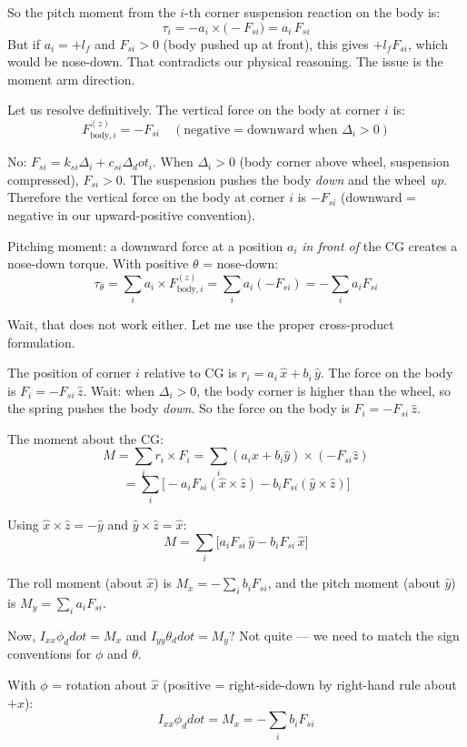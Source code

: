 \documentclass[11pt]{article}
\def\vect#1{#1}%
\def\ddot#1{#1_ddot}%
\def\dot#1{#1_dot}%
\newcommand{\vect}[1]{\bm{#1}}
\begin{document}
So the pitch moment from the $i$-th corner suspension reaction on the body is:
\[
\tau_i = -a_i \times \bigl(-F_{si}\bigr) = a_i\,F_{si}
\]
But if $a_i = +l_f$ and $F_{si}>0$ (body pushed up at front), this gives $+l_f F_{si}$, which would be nose-down. That contradicts our physical reasoning. The issue is the moment arm direction.

Let us resolve definitively. The vertical force on the body at corner $i$ is:
\[
F_{\text{body},i}^{(z)} = -F_{si} \quad (\text{negative} = \text{downward when } \Delta_i>0)
\]

No: $F_{si} = k_{si}\Delta_i + c_{si}\dot{\Delta}_i$. When $\Delta_i > 0$ (body corner above wheel, suspension compressed), $F_{si}>0$. The suspension pushes the body \emph{down} and the wheel \emph{up}. Therefore the vertical force on the body at corner $i$ is $-F_{si}$ (downward = negative in our upward-positive convention).

Pitching moment: a downward force at a position $a_i$ \emph{in front of} the CG creates a nose-down torque. With positive $\theta$ = nose-down:
\[
\tau_\theta = \sum_i a_i \times F_{\text{body},i}^{(z)} = \sum_i a_i(-F_{si}) = -\sum_i a_i F_{si}
\]

Wait, that does not work either. Let me use the proper cross-product formulation.

The position of corner $i$ relative to CG is $\vect{r}_i = a_i\,\hat{x} + b_i\,\hat{y}$. The force on the body is $\vect{F}_i = -F_{si}\,\hat{z}$. Wait: when $\Delta_i>0$, the body corner is higher than the wheel, so the spring pushes the body \emph{down}. So the force on the body is $\vect{F}_i = -F_{si}\,\hat{z}$.

The moment about the CG:
\[
\vect{M} = \sum_i \vect{r}_i \times \vect{F}_i = \sum_i (a_i\hat{x}+b_i\hat{y})\times(-F_{si}\hat{z})
\]
\[
= \sum_i\bigl[-a_i F_{si}(\hat{x}\times\hat{z}) - b_i F_{si}(\hat{y}\times\hat{z})\bigr]
\]

Using $\hat{x}\times\hat{z} = -\hat{y}$ and $\hat{y}\times\hat{z} = \hat{x}$:
\[
\vect{M} = \sum_i\bigl[a_i F_{si}\,\hat{y} - b_i F_{si}\,\hat{x}\bigr]
\]

The roll moment (about $\hat{x}$) is $M_x = -\sum_i b_i F_{si}$, and the pitch moment (about $\hat{y}$) is $M_y = \sum_i a_i F_{si}$.

Now, $I_{xx}\ddot{\phi} = M_x$ and $I_{yy}\ddot{\theta} = M_y$? Not quite --- we need to match the sign conventions for $\phi$ and $\theta$.

With $\phi$ = rotation about $\hat{x}$ (positive = right-side-down by right-hand rule about $+x$):
\[
I_{xx}\ddot\phi = M_x = -\sum_i b_i F_{si}
\]
\end{document}
